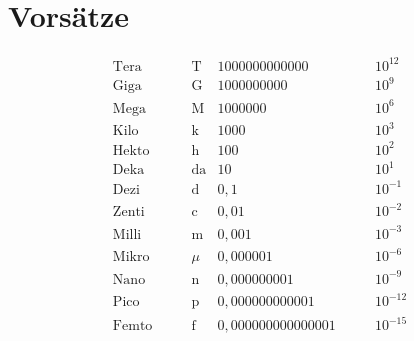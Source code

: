 \section{Vorsätze}

\begin{boxshaded}
\begin{align*}
\text{Tera}\qquad&\text{T}&1000000000000\qquad&10^{12}\\
\text{Giga}\qquad&\text{G}&1000000000\qquad&10^9\\
\text{Mega}\qquad&\text{M}&1000000\qquad&10^6\\
\text{Kilo}\qquad&\text{k}&1000\qquad&10^3\\
\text{Hekto}\qquad&\text{h}&100\qquad&10^2\\
\text{Deka}\qquad&\text{da}&10\qquad&10^1\\
\text{Dezi}\qquad&\text{d}&0,1\qquad&10^{-1}\\
\text{Zenti}\qquad&\text{c}&0,01\qquad&10^{-2}\\
\text{Milli}\qquad&\text{m}&0,001\qquad&10^{-3}\\
\text{Mikro}\qquad&\mu&0,000001\qquad&10^{-6}\\
\text{Nano}\qquad&\text{n}&0,000000001\qquad&10^{-9}\\
\text{Pico}\qquad&\text{p}&0,000000000001\qquad&10^{-12}\\
\text{Femto}\qquad&\text{f}&0,000000000000001\qquad&10^{-15}\\
\end{align*}
\end{boxshaded}